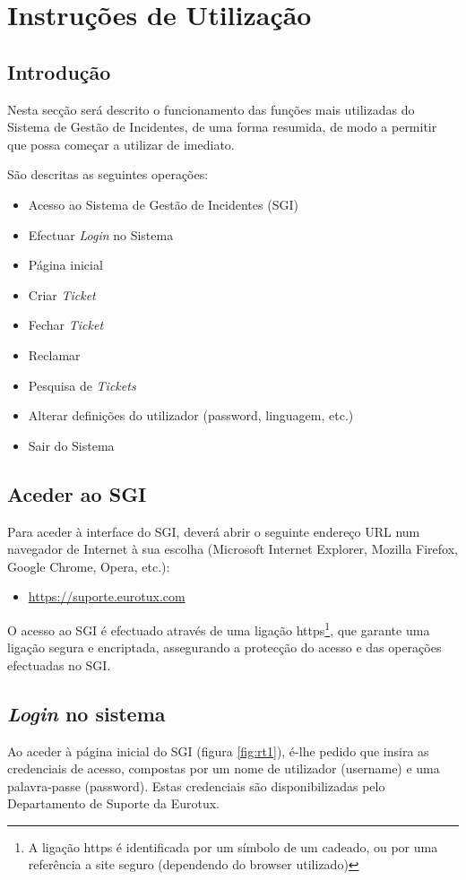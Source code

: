 \chapter{Instruções de Utilização}
\section{Introdução}
Nesta secção será descrito o funcionamento das funções mais utilizadas do Sistema de Gestão de Incidentes, de uma forma resumida, de modo a permitir que possa começar a utilizar de imediato.

São descritas as seguintes operações:
\begin{itemize}
\item Acesso ao Sistema de Gestão de Incidentes (SGI)
\item Efectuar \textit{Login} no Sistema
\item Página inicial
\item Criar \textit{Ticket}
\item Fechar \textit{Ticket}
\item Reclamar
\item Pesquisa de \textit{Tickets}
\item Alterar definições do utilizador (password, linguagem, etc.)
\item Sair do Sistema
\end{itemize}

\section{Aceder ao SGI}
Para aceder à interface do SGI, deverá abrir o seguinte endereço URL num navegador de Internet à sua escolha (Microsoft Internet Explorer, Mozilla Firefox, Google Chrome, Opera, etc.):

\begin{itemize}
\item \url{https://suporte.eurotux.com}
\end{itemize}

O acesso ao SGI é efectuado através de uma ligação https\footnote{A ligação https é identificada por um símbolo de um cadeado, ou por uma referência a site seguro (dependendo do browser utilizado)}, que garante uma ligação segura e encriptada, assegurando a protecção do acesso e das operações efectuadas no SGI.

\section{\textit{Login} no sistema}
Ao aceder à página inicial do SGI (figura \ref{fig:rt1}), é-lhe pedido que insira as credenciais de acesso, compostas por um nome de utilizador (username) e uma palavra-passe (password). Estas credenciais são disponibilizadas pelo Departamento de Suporte da Eurotux.

